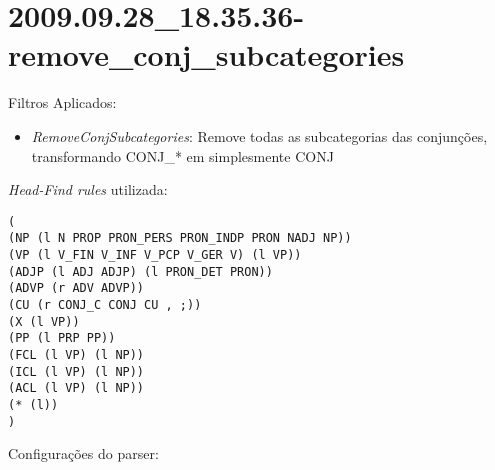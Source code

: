 \section{2009.09.28_18.35.36-remove_conj_subcategories} %
\label{sec:exp:2009.09.28_18.35.36-remove_conj_subcategories}

Filtros Aplicados:

\begin{itemize}
  
  \item{\emph{RemoveConjSubcategories}: Remove todas as subcategorias das conjunções, transformando CONJ_* em simplesmente CONJ}
  
\end{itemize}

\emph{Head-Find rules} utilizada:

\scriptsize
\begin{verbatim}
(
(NP (l N PROP PRON_PERS PRON_INDP PRON NADJ NP))
(VP (l V_FIN V_INF V_PCP V_GER V) (l VP))
(ADJP (l ADJ ADJP) (l PRON_DET PRON))
(ADVP (r ADV ADVP))
(CU (r CONJ_C CONJ CU , ;))
(X (l VP))
(PP (l PRP PP))
(FCL (l VP) (l NP))
(ICL (l VP) (l NP))
(ACL (l VP) (l NP))
(* (l))
)

\end{verbatim}

\normalsize

Configurações do parser:

